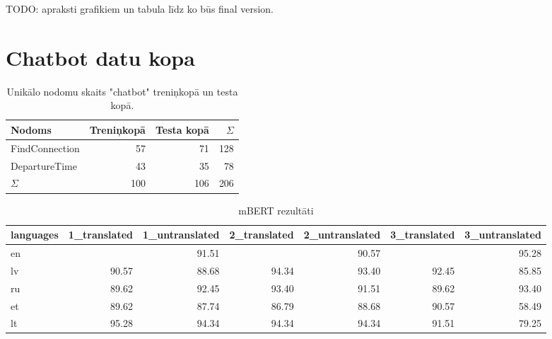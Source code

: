 TODO: apraksti grafikiem un tabula līdz ko būs final version.

\section{Chatbot datu kopa}

\begin{table}[htbp]
  \centering
  \caption{Unikālo nodomu skaits "chatbot" treniņkopā un testa kopā.}
    \begin{tabular}{lrrr} \toprule
    Nodoms & Treniņkopā & Testa kopā & $\Sigma$ \\\midrule
    FindConnection & 57    & 71 & 128 \\
    DepartureTime & 43    & 35 & 78 \\
    $\Sigma$ & 100    & 106 & 206 \\\bottomrule
    \end{tabular}%
  \label{tab:chatbot-labels}%
\end{table}%


\begin{table}[htbp]
  \centering
  \caption{mBERT rezultāti}
    \begin{tabular}{lrrrrrr} \toprule
    languages & 1\_translated & 1\_untranslated & 2\_translated & 2\_untranslated & 3\_translated & 3\_untranslated \\\midrule
    en    &       & 91.51 &       & 90.57 &       & 95.28 \\
    lv    & 90.57 & 88.68 & 94.34 & 93.40 & 92.45 & 85.85 \\
    ru    & 89.62 & 92.45 & 93.40 & 91.51 & 89.62 & 93.40 \\
    et    & 89.62 & 87.74 & 86.79 & 88.68 & 90.57 & 58.49 \\
    lt    & 95.28 & 94.34 & 94.34 & 94.34 & 91.51 & 79.25 \\\bottomrule
    \end{tabular}%
  \label{tab:chatbot-bert}%
\end{table}%

